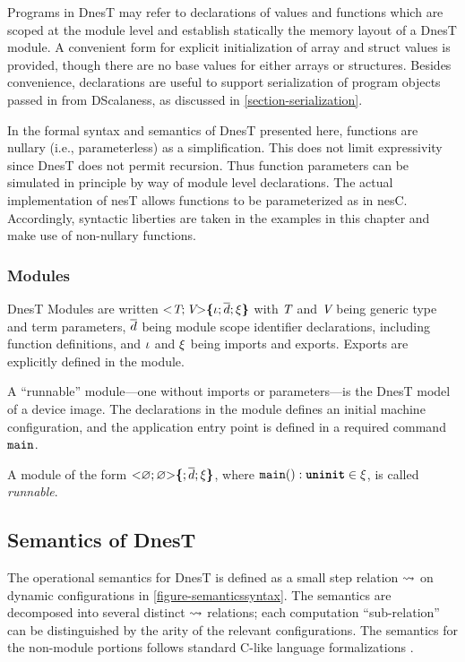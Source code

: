 Programs in DnesT may refer to declarations of values and functions which are scoped at the
module level and establish statically the memory layout of a DnesT module. A convenient form for
explicit initialization of array and struct values is provided, though there are no base values
for either arrays or structures. Besides convenience, declarations are useful to support
serialization of program objects passed in from DScalaness, as discussed in
\autoref{section-serialization}.

In the formal syntax and semantics of DnesT presented here, functions are nullary (i.e.,
parameterless) as a simplification. This does not limit expressivity since DnesT does not permit
recursion. Thus function parameters can be simulated in principle by way of module level
declarations. The actual implementation of nesT allows functions to be parameterized as in nesC.
Accordingly, syntactic liberties are taken in the examples in this chapter and make use of
non-nullary functions.

\subsubsection{Modules}

DnesT Modules are written $\margs{\tpdecl; \vpdecl}\lc \imports; \decls \exports \rc$ with
$\tpdecl$ and $\vpdecl$ being generic type and term parameters, $\vect{d}$ being module scope
identifier declarations, including function definitions, and $\imports$ and $\exports$ being
imports and exports. Exports are explicitly defined in the module.

A ``runnable'' module---one without imports or parameters---is the DnesT model of a device
image. The declarations in the module defines an initial machine configuration, and the
application entry point is defined in a required command $\tt{main}$.
\begin{definition}
\label{definition-runnable}
A module of the form $\margs{\varnothing; \varnothing }\lc ; \vect{\decl}; \exports\rc$, where
$\tt{main}() : \undefv \in \exports$, is called \emph{runnable}.
\end{definition}

\subsection{Semantics of DnesT} 
\label{section-dnestsemantics}

The operational semantics for DnesT is defined as a small step relation $\compute$ on dynamic
configurations in \autoref{figure-semanticssyntax}. The semantics are decomposed into several
distinct $\compute$ relations; each computation ``sub-relation'' can be distinguished by the
arity of the relevant configurations. The semantics for the non-module portions follows standard
C-like language formalizations \cite{Leroy-compcert-06,grossman03}.


